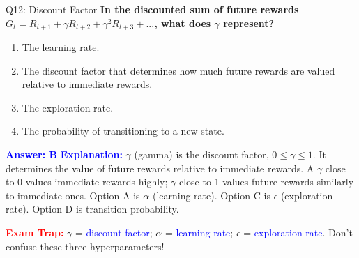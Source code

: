 \documentclass[8pt]{beamer}
\begin{document}
	\begin{frame}{Q12: Discount Factor}
		\fontsize{6.5}{7.5}\selectfont
		\textbf{In the discounted sum of future rewards $G_t = R_{t+1} + \gamma R_{t+2} + \gamma^2 R_{t+3} + ...$, what does $\gamma$ represent?}
		
		\begin{enumerate}
			\item The learning rate.
			\item The discount factor that determines how much future rewards are valued relative to immediate rewards.
			\item The exploration rate.
			\item The probability of transitioning to a new state.
		\end{enumerate}
		
		\vspace{0.1cm}
		\textcolor{blue}{\textbf{Answer: B}}
		\vspace{0.1cm}
		\textcolor{blue}{\textbf{Explanation:}} $\gamma$ (gamma) is the discount factor, $0 \leq \gamma \leq 1$. It determines the value of future rewards relative to immediate rewards. A $\gamma$ close to 0 values immediate rewards highly; $\gamma$ close to 1 values future rewards similarly to immediate ones. Option A is $\alpha$ (learning rate). Option C is $\epsilon$ (exploration rate). Option D is transition probability.
		
		\textcolor{red}{\textbf{Exam Trap:}} $\gamma$ = \textcolor{blue}{discount factor}; $\alpha$ = \textcolor{blue}{learning rate}; $\epsilon$ = \textcolor{blue}{exploration rate}. Don't confuse these three hyperparameters!
	\end{frame}
	
\end{document}
